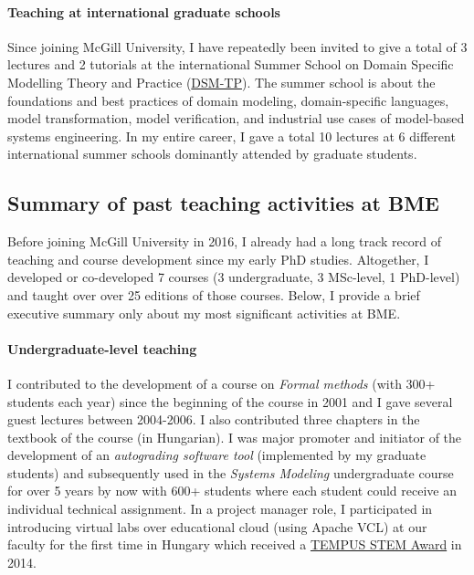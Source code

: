 \paragraph{Teaching at international graduate schools}
Since joining McGill University, I have repeatedly been invited to give a total of 3 lectures and 2 tutorials at the international Summer School on Domain Specific Modelling Theory and Practice (\href{http://msdl.cs.mcgill.ca/conferences/dsm-tp-2017}{DSM-TP}). The summer school is about the foundations and best practices of domain modeling, domain-specific languages, model transformation, model verification, and industrial use cases of model-based systems engineering.
In my entire career, I gave a total 10 lectures at 6 different international summer schools dominantly attended by graduate students.

\subsection{Summary of past teaching activities at BME}

Before joining McGill University in 2016, I already had a long track record of teaching and course development since my early PhD studies. Altogether, I developed or co-developed 7 courses (3 undergraduate, 3 MSc-level, 1 PhD-level) and taught  over over 25 editions of those courses. Below, I provide a brief executive summary only about my most significant activities at BME. 

\paragraph{Undergraduate-level teaching}
I contributed to the development of a course on \emph{Formal methods} (with 300+ students each year) since the beginning of the course in 2001 and I gave several guest lectures between 2004-2006. I also contributed three chapters in the textbook of the course (in Hungarian).  
I was major promoter and initiator of the development of an \emph{autograding software tool} (implemented by my graduate students) and subsequently used in the \emph{Systems Modeling} undergraduate course for over 5 years by now with 600+ students where each student could receive an individual technical assignment. 
In a project manager role, I participated in introducing virtual labs over educational cloud (using Apache VCL) at our faculty for the first time in Hungary which received a \href{https://inf.mit.bme.hu/en/news/2014/02/tempus-stem-call-apache-vcl-based-labs-won-prize}{TEMPUS STEM Award} in 2014. 

